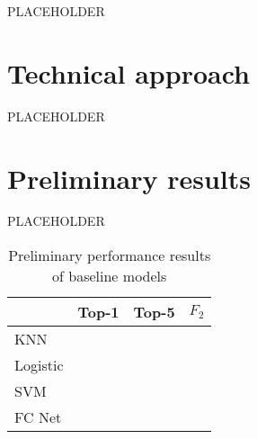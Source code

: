\documentclass[10pt,twocolumn,letterpaper]{article}
\begin{document}
PLACEHOLDER

\section{Technical approach}

PLACEHOLDER

\section{Preliminary results}

PLACEHOLDER

\begin{table}
   \begin{center}
   \begin{tabular}{|l|c|c|c|}
   \hline
   & Top-1 & Top-5 & $F_2$ \\
   \hline\hline
   KNN &&& \\
   Logistic &&& \\
   SVM &&& \\
   FC Net &&&\\
   \hline
   \end{tabular}
   \end{center}
   \caption{Preliminary performance results of baseline models}
\end{table}




{\small


}
\end{document}
